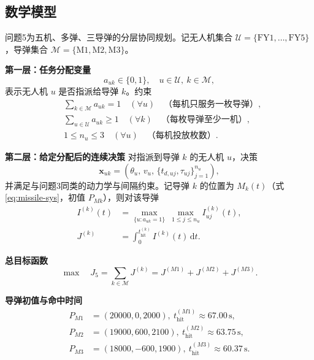 \documentclass[withoutpreface,bwprint]{cumcmthesis}
\begin{document}
\subsection{数学模型}
问题5为五机、多弹、三导弹的分层协同规划。记无人机集合 $\mathcal{U}=\{\mathrm{FY1},\ldots,\mathrm{FY5}\}$，导弹集合 $\mathcal{M}=\{\mathrm{M1},\mathrm{M2},\mathrm{M3}\}$。

\textbf{第一层：任务分配变量}
\begin{equation}
a_{uk}\in\{0,1\},\quad
u\in\mathcal{U},\ k\in\mathcal{M},
\label{eq:q5-assign-var}
\end{equation}
表示无人机 $u$ 是否指派给导弹 $k$。约束
\begin{equation}
\begin{aligned}
&\sum_{k\in\mathcal{M}}a_{uk}=1\quad(\forall u)
\quad\text{（每机只服务一枚导弹）},\\
&\sum_{u\in\mathcal{U}}a_{uk}\ge 1\quad(\forall k)
\quad\text{（每枚导弹至少一机）},\\
&1\le n_u\le 3\quad(\forall u)
\quad\text{（每机投放枚数）}.
\end{aligned}
\label{eq:q5-assign-con}
\end{equation}

\textbf{第二层：给定分配后的连续决策}
对指派到导弹 $k$ 的无人机 $u$，决策
\begin{equation}
\mathbf{x}_{uk}=(\theta_u,\,v_u,\,\{t_{d,uj},\tau_{uj}\}_{j=1}^{n_u}),
\label{eq:q5-cont}
\end{equation}
并满足与问题3同类的动力学与间隔约束。记导弹 $k$ 的位置为 $M_k(t)$（式\eqref{eq:missile-sys}，初值 $P_{Mk}$），则对该导弹
\begin{equation}
\begin{aligned}
I^{(k)}(t)
&=\max_{\{u:a_{uk}=1\}}\ \max_{1\le j\le n_u}
I_{uj}^{(k)}(t),\\
J^{(k)}
&=\int_{0}^{t_{\mathrm{hit}}^{(k)}} I^{(k)}(t)\,\mathrm{d}t.
\end{aligned}
\label{eq:q5-Jk}
\end{equation}

\textbf{总目标函数}
\begin{equation}
\max\quad
J_5=\sum_{k\in\mathcal{M}}J^{(k)}
=J^{(M1)}+J^{(M2)}+J^{(M3)}.
\label{eq:q5-obj}
\end{equation}

\textbf{导弹初值与命中时间}
\begin{equation}
\begin{aligned}
P_{M1}&=(20000,0,2000),\ 
t_{\mathrm{hit}}^{(M1)}\approx 67.00\,\mathrm{s},\\
P_{M2}&=(19000,600,2100),\ 
t_{\mathrm{hit}}^{(M2)}\approx 63.75\,\mathrm{s},\\
P_{M3}&=(18000,-600,1900),\ 
t_{\mathrm{hit}}^{(M3)}\approx 60.37\,\mathrm{s}.
\end{aligned}
\label{eq:q5-missile}
\end{equation}
\end{document}
